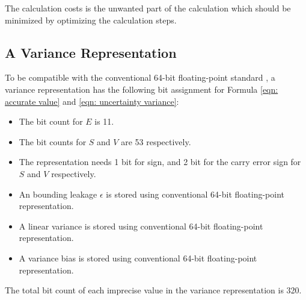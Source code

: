 \documentclass[twoside]{article}
\numberwithin{equation}{section}
\begin{document}
The calculation costs is the unwanted part of the calculation which should be minimized by optimizing the calculation steps.




\subsection{A Variance Representation}

To be compatible with the conventional 64-bit floating-point standard \cite{Floating_Point_Standard}, a variance representation has the following bit assignment for Formula \eqref{eqn: accurate value} and \eqref{eqn: uncertainty variance}:
\begin{itemize}
\item The bit count for $E$ is 11.

\item The bit counts for $S$ and $V$ are 53 respectively.

\item The representation needs 1 bit for sign, and 2 bit for the carry error sign for $S$ and $V$ respectively.

\item An bounding leakage $\epsilon$ is stored using conventional 64-bit floating-point representation.

\item A linear variance is stored using conventional 64-bit floating-point representation.

\item A variance bias is stored using conventional 64-bit floating-point representation.
\end{itemize}
The total bit count of each imprecise value in the variance representation is 320.
\end{document}

